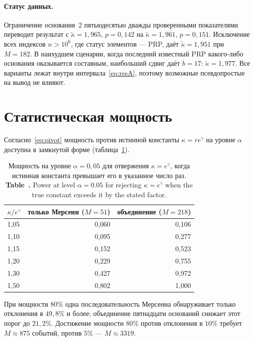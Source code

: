 \documentclass[11pt,a4paper]{article}
\newcommand{\encaptab}[1]{\\[3pt]\foreignlanguage{english}{%
  \textbf{Table~\thetable.} #1}}
\theoremstyle{plain}
\theoremstyle{remark}
\newcommand{\eg}{e^{\gamma}}
\begin{document}
\paragraph{Статус данных.} Ограничение основания~2 пятьюдесятью дважды проверенными
показателями переводит результат с $\tilde\kappa=1{,}965$, $p=0{,}142$ на
$\tilde\kappa=1{,}961$, $p=0{,}151$. Исключение всех индексов $n>10^6$, где статус
элементов --- PRP, даёт $\tilde\kappa=1{,}951$ при $M=182$. В наихудшем сценарии, когда
последний известный PRP какого-либо основания оказывается составным, наибольший сдвиг
даёт $b=17$: $\tilde\kappa=1{,}977$. Все варианты лежат внутри интервала~\eqref{eq:resA},
поэтому возможные псевдопростые на вывод не влияют.

\section{Статистическая мощность}\label{sec:power}

Согласно~\eqref{eq:pivot} мощность против истинной константы $\kappa=r\eg$ на уровне
$\alpha$ доступна в замкнутой форме (таблица~\ref{tab:power}).

\begin{table}[t]
\centering
\caption{Мощность на уровне $\alpha=0{,}05$ для отвержения $\kappa=\eg$, когда истинная
константа превышает его в указанное число раз.
\encaptab{Power at level $\alpha=0.05$ for rejecting $\kappa=\eg$ when the true
constant exceeds it by the stated factor.}}
\label{tab:power}
\small
\begin{tabular}{lrr}
\toprule
$\kappa/\eg$ & только Мерсенн ($M=51$) & объединение ($M=218$)\\
\midrule
1{,}05 & 0{,}060 & 0{,}106\\
1{,}10 & 0{,}095 & 0{,}277\\
1{,}15 & 0{,}152 & 0{,}523\\
1{,}20 & 0{,}229 & 0{,}755\\
1{,}30 & 0{,}427 & 0{,}972\\
1{,}50 & 0{,}802 & 1{,}000\\
\bottomrule
\end{tabular}
\end{table}

При мощности $80\%$ одна последовательность Мерсенна обнаруживает только отклонения
в $49{,}8\%$ и более; объединение пятнадцати оснований снижает этот порог до $21{,}2\%$.
Достижение мощности $80\%$ против отклонения в $10\%$ требует $M\approx875$ событий,
против $5\%$ --- $M\approx3319$.
\end{document}
